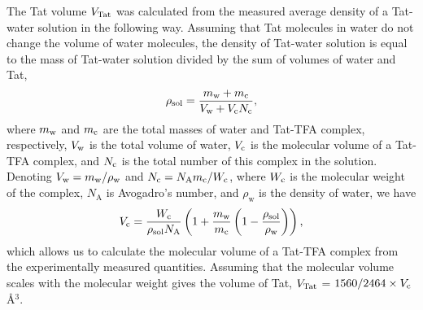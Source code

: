 The Tat volume $V_\textrm{Tat}$ was calculated from the measured average density of a 
Tat-water solution in the following way. Assuming that Tat
molecules in water do not change the volume of water molecules, the density
of Tat-water solution is equal to the mass of Tat-water solution divided
by the sum of volumes of water and Tat, 
\begin{equation}
  \rho_\textrm{sol} = \frac{m_\textrm{w}+m_\textrm{c}}{V_\textrm{w}+V_\textrm{c}N_\textrm{c}},
\end{equation}
where $m_\textrm{w}$ and $m_\textrm{c}$
are the total masses of water and Tat-TFA complex, respectively, 
$V_\textrm{w}$ is the total volume of 
water, $V_\textrm{c}$ is the molecular volume of a Tat-TFA complex, and $N_\textrm{c}$ is the total number 
of this complex in the solution. 
Denoting $V_\textrm{w}=m_\textrm{w}/\rho_\textrm{w}$ 
and $N_\textrm{c}=N_\textrm{A}m_\textrm{c}/W_\textrm{c}$, 
where $W_\textrm{c}$ is the molecular weight of the complex, 
$N_\textrm{A}$ is Avogadro's number,
and $\rho_\textrm{w}$ is the density of water, we have
\begin{equation}
  V_\textrm{c} = \frac{W_\textrm{c}}{\rho_\textrm{sol}N_\textrm{A}} \left( 
        1 + \frac{m_\textrm{w}}{m_\textrm{c}}\left(1-\frac{\rho_\textrm{sol}}{\rho_\textrm{w}}\right) 
        \right),
\end{equation}
which allows us to calculate the molecular volume of a Tat-TFA complex 
from the experimentally measured quantities. 
Assuming that the molecular
volume scales with the molecular weight gives the volume of Tat, 
$V_\textrm{Tat}$ = $1560/2464\times V_\textrm{c}$ \AA$^3$. 

